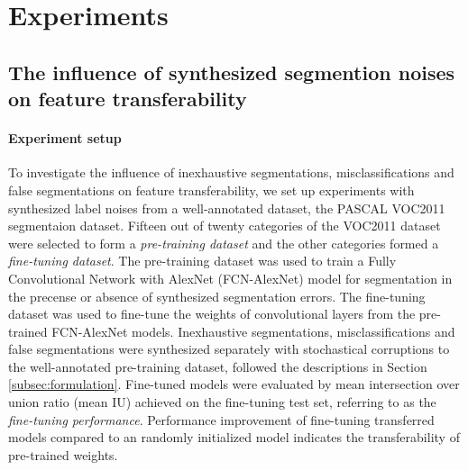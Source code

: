 \section{Experiments}
\label{sec:experiments}

\subsection{The influence of synthesized segmention noises on feature transferability}
\label{subsec:robustness}


\paragraph{Experiment setup}
To investigate the influence of inexhaustive segmentations, misclassifications and false segmentations on feature transferability, we set up experiments with synthesized label noises from a well-annotated dataset, the PASCAL VOC2011 segmentaion dataset\cite{everingham2015pascal}.
Fifteen out of twenty categories of the VOC2011 dataset were selected to form a \textit{pre-training dataset} and the other categories formed a \textit{fine-tuning dataset}.
The pre-training dataset was used to train a Fully Convolutional Network with AlexNet (FCN-AlexNet) model\cite{long2015fully} for segmentation in the precense or absence of synthesized segmentation errors.
The fine-tuning dataset was used to fine-tune the weights of convolutional layers from the pre-trained FCN-AlexNet models.
Inexhaustive segmentations, misclassifications and false segmentations were synthesized separately with stochastical corruptions to the well-annotated pre-training dataset, followed the descriptions in Section \ref{subsec:formulation}.
Fine-tuned models were evaluated by mean intersection over union ratio (mean IU) achieved on the fine-tuning test set, referring to as the \textit{fine-tuning performance}.
Performance improvement of fine-tuning transferred models compared to an randomly initialized model indicates the transferability of pre-trained weights.

